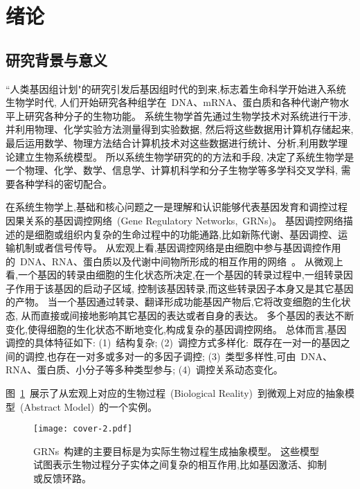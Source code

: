 \section{绪论}
\subsection{研究背景与意义}

``人类基因组计划"的研究引发后基因组时代的到来,标志着生命科学开始进入系统生物学时代,
人们开始研究各种组学在~DNA、mRNA、蛋白质和各种代谢产物水平上研究各种分子的生物功能。
系统生物学首先通过生物学技术对系统进行干涉,并利用物理、化学实验方法测量得到实验数据,
然后将这些数据用计算机存储起来,最后运用数学、物理方法结合计算机技术对这些数据进行统计、分析,利用数学理论建立生物系统模型。
所以系统生物学研究的的方法和手段,
决定了系统生物学是一个物理、化学、数学、信息学、计算机科学和分子生物学等多学科交叉学科,
需要各种学科的密切配合\cite{ideker2001new}。

在系统生物学上,基础和核心问题之一是理解和认识能够代表基因发育和调控过程因果关系的基因调控网络~(Gene Regulatory Networks,~GRNs)。
基因调控网络描述的是细胞或组织内复杂的生命过程中的功能通路,比如新陈代谢、基因调控、运输机制或者信号传导。
从宏观上看,基因调控网络是由细胞中参与基因调控作用的~DNA、RNA、蛋白质以及代谢中间物所形成的相互作用的网络~\cite{de2002modeling}。
从微观上看,一个基因的转录由细胞的生化状态所决定,在一个基因的转录过程中,一组转录因子作用于该基因的启动子区域,
控制该基因转录,而这些转录因子本身又是其它基因的产物。
当一个基因通过转录、翻译形成功能基因产物后,它将改变细胞的生化状态,
从而直接或间接地影响其它基因的表达或者自身的表达。
多个基因的表达不断变化,使得细胞的生化状态不断地变化,构成复杂的基因调控网络。
总体而言,基因调控的具体特征如下:
(1)~结构复杂;
(2)~调控方式多样化:~既存在一对一的基因之间的调控,也存在一对多或多对一的多因子调控;
(3)~类型多样性,可由~DNA、RNA、蛋白质、小分子等多种类型参与;
(4)~调控关系动态变化。

图~\ref{cover-2}~展示了从宏观上对应的生物过程~(Biological Reality)~到微观上对应的抽象模型~(Abstract Model)~的一个实例。
\begin{figure}[!htbp]
    \centering
    \texttt{[image: cover-2.pdf]}
    \caption{GRNs~构建的主要目标是为实际生物过程生成抽象模型。
    这些模型试图表示生物过程分子实体之间复杂的相互作用,比如基因激活、抑制或反馈环路。
    }
    \label{cover-2}
\end{figure}

